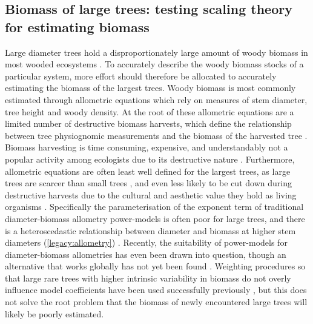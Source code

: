 \begin{refsection}
\subsection{Biomass of large trees: testing scaling theory for estimating biomass}
\label{legacy:ssec:scaling}

Large diameter trees hold a disproportionately large amount of woody biomass in most wooded ecosystems \citep{Bastin2015, Lutz2018}. To accurately describe the woody biomass stocks of a particular system, more effort should therefore be allocated to accurately estimating the biomass of the largest trees. Woody biomass is most commonly estimated through allometric equations which rely on measures of stem diameter, tree height and woody density. At the root of these allometric equations are a limited number of destructive biomass harvests, which define the relationship between tree physiognomic measurements and the biomass of the harvested tree \citep{Chave2005}. Biomass harvesting is time consuming, expensive, and understandably not a popular activity among ecologists due to its destructive nature \citep{Roxburgh2015}. Furthermore, allometric equations are often least well defined for the largest trees, as large trees are scarcer than small trees \citep{Lutz2018, Lindenmayer2012}, and even less likely to be cut down during destructive harvests due to the cultural and aesthetic value they hold as living organisms \citep{Blicharska2014}. Specifically the parameterisation of the exponent term of traditional diameter-biomass allometry power-models is often poor for large trees, and there is a heteroscedastic relationship between diameter and biomass at higher stem diameters (\autoref{legacy:allometry}) \citep{Chave2004, Chave2014}. Recently, the suitability of power-models for diameter-biomass allometries has even been drawn into question, though an alternative that works globally has not yet been found \citep{Picard2015}. Weighting procedures so that large rare trees with higher intrinsic variability in biomass do not overly influence model coefficients have been used successfully previously \citep{Chave2014, McNicol2015b}, but this does not solve the root problem that the biomass of newly encountered large trees will likely be poorly estimated. 


\end{refsection}
